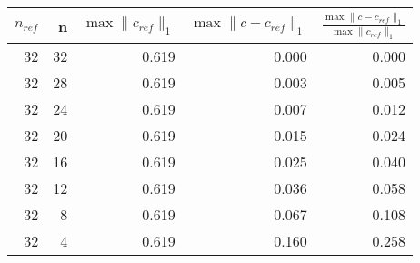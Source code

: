 \begin{tabular}{rrrrr}
\toprule
$n_{ref}$ & n & $\max \| c_{ref} \|_1$ & $\max \| c-c_{ref} \|_1$ & $\frac{\max \| c-c_{ref} \|_1}{\max \| c_{ref} \|_1}$ \\
\midrule
32 & 32 & 0.619 & 0.000 & 0.000 \\
32 & 28 & 0.619 & 0.003 & 0.005 \\
32 & 24 & 0.619 & 0.007 & 0.012 \\
32 & 20 & 0.619 & 0.015 & 0.024 \\
32 & 16 & 0.619 & 0.025 & 0.040 \\
32 & 12 & 0.619 & 0.036 & 0.058 \\
32 & 8 & 0.619 & 0.067 & 0.108 \\
32 & 4 & 0.619 & 0.160 & 0.258 \\
\bottomrule
\end{tabular}
